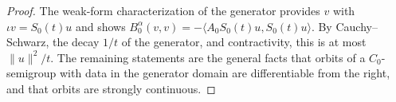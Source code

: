 \begin{proof}
\leanok
The weak-form characterization of the generator provides $v$ with $\iota v = S_0(t)u$ and shows $B_0^\alpha(v,v) = -\langle A_0 S_0(t)u, S_0(t)u\rangle$. By Cauchy--Schwarz, the decay $1/t$ of the generator, and contractivity, this is at most $\lVert u \rVert^2 / t$. The remaining statements are the general facts that orbits of a $C_0$-semigroup with data in the generator domain are differentiable from the right, and that orbits are strongly continuous.
\end{proof}
